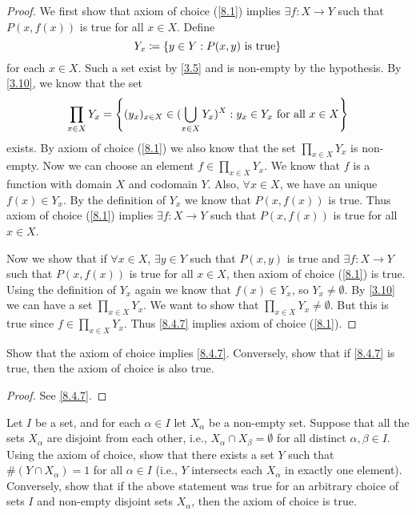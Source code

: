 \begin{proof}
  We first show that axiom of choice (\cref{8.1}) implies \(\exists f : X \to Y\) such that \(P(x, f(x))\) is true for all \(x \in X\).
  Define
  \[
    Y_x \coloneqq \left\lbrace y \in Y : P(x, y) \text{ is true}\right\rbrace
  \]
  for each \(x \in X\).
  Such a set exist by \cref{3.5} and is non-empty by the hypothesis.
  By \cref{3.10}, we know that the set
  \[
    \prod_{x \in X} Y_x = \left\lbrace(y_x)_{x \in X} \in (\bigcup_{x \in X} Y_x)^X : y_x \in Y_x \text{ for all } x \in X\right\rbrace
  \]
  exists.
  By axiom of choice (\cref{8.1}) we also know that the set \(\prod_{x \in X} Y_x\) is non-empty.
  Now we can choose an element \(f \in \prod_{x \in X} Y_x\).
  We know that \(f\) is a function with domain \(X\) and codomain \(Y\).
  Also, \(\forall x \in X\), we have an unique \(f(x) \in Y_x\).
  By the definition of \(Y_x\) we know that \(P(x, f(x))\) is true.
  Thus axiom of choice (\cref{8.1}) implies \(\exists f : X \to Y\) such that \(P(x, f(x))\) is true for all \(x \in X\).

  Now we show that if \(\forall x \in X\), \(\exists y \in Y\) such that \(P(x, y)\) is true and \(\exists f : X \to Y\) such that \(P(x, f(x))\) is true for all \(x \in X\), then axiom of choice (\cref{8.1}) is true.
  Using the definition of \(Y_x\) again we know that \(f(x) \in Y_x\), so \(Y_x \neq \emptyset\).
  By \cref{3.10} we can have a set \(\prod_{x \in X} Y_x\).
  We want to show that \(\prod_{x \in X} Y_x \neq \emptyset\).
  But this is true since \(f \in \prod_{x \in X} Y_x\).
  Thus \cref{8.4.7} implies axiom of choice (\cref{8.1}).
\end{proof}

\exercisesection

\begin{ex}\label{ex:8.4.1}
  Show that the axiom of choice implies \cref{8.4.7}.
  Conversely, show that if \cref{8.4.7} is true, then the axiom of choice is also true.
\end{ex}

\begin{proof}
  See \cref{8.4.7}.
\end{proof}

\begin{ex}\label{ex:8.4.2}
  Let \(I\) be a set, and for each \(\alpha \in I\) let \(X_{\alpha}\) be a non-empty set.
  Suppose that all the sets \(X_{\alpha}\) are disjoint from each other, i.e., \(X_{\alpha} \cap X_{\beta} = \emptyset\) for all distinct \(\alpha, \beta \in I\).
  Using the axiom of choice, show that there exists a set \(Y\) such that \(\#(Y \cap X_{\alpha}) = 1\) for all \(\alpha \in I\) (i.e., \(Y\) intersects each \(X_{\alpha}\) in exactly one element).
  Conversely, show that if the above statement was true for an arbitrary choice of sets \(I\) and non-empty disjoint sets \(X_{\alpha}\), then the axiom of choice is true.
\end{ex}

